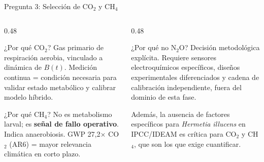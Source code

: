 \documentclass[aspectratio=169, 11pt]{beamer}
\newcommand{\BSF}{\textit{Hermetia illucens}}
\newcommand{\MRV}{\text{MRV}}
\begin{document}
\begin{frame}{Pregunta 3: Selección de CO$_2$ y CH$_4$}
\begin{columns}[T]
\begin{column}{0.48\textwidth}
\begin{block}{¿Por qué CO$_2$?}
\footnotesize
Gas primario de respiración aerobia, vinculado a dinámica de $B(t)$. Medición continua = condición necesaria para validar estado metabólico y calibrar modelo híbrido.
\end{block}
\begin{block}{¿Por qué CH$_4$?}
\footnotesize
No es metabolismo larval; es \textbf{señal de fallo operativo}. Indica anaerobiosis. GWP 27,2$\times$ CO$_2$ (AR6) = mayor relevancia climática en corto plazo.
\end{block}
\end{column}
\begin{column}{0.48\textwidth}
\begin{alertblock}{¿Por qué no N$_2$O?}
\footnotesize
Decisión metodológica explícita. Requiere sensores electroquímicos específicos, diseños experimentales diferenciados y cadena de calibración independiente, fuera del dominio de esta fase.

Además, la ausencia de factores específicos para \BSF{} en IPCC/IDEAM es crítica para CO$_2$ y CH$_4$, que son los que \MRV{} exige cuantificar.
\end{alertblock}
\end{column}
\end{columns}
\end{frame}
\end{document}
